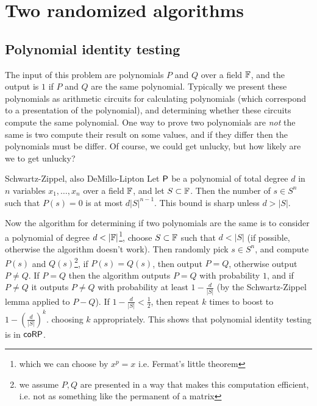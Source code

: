 \documentclass{article}
\begin{document}
\newlec 


\newlec 


\newlec 

\section{Two randomized algorithms}
\subsection{Polynomial identity testing}
The input of this problem are polynomials $P$ and $Q$ over a field $\mathbb{F}$, and the output is $1$ if $P$ and $Q$ are the same polynomial. Typically we present these polynomials as arithmetic circuits for calculating polynomials (which correspond to a presentation of the polynomial), and determining whether these circuits compute the same polynomial. \gap 
One way to prove two polynomials are \textit{not} the same is two compute their result on some values, and if they differ then the polynomials must be differ. Of course, we could get unlucky, but how likely are we to get unlucky?
\begin{fancylem}{Schwartz-Zippel, also DeMillo-Lipton}
    Let $\mathsf{P}$ be a polynomial of total degree $d$ in $n$ variables $x_{1}, \dots, x_{n}$ over a field $\mathbb{F}$, and let $S \subset \mathbb{F}$. Then the number of $s \in S^{n}$ such that $P(s)=0$ is at most $d|S|^{n-1}$. This bound is sharp unless $d > |S|$.
\end{fancylem}
\endproof 
Now the algorithm for determining if two polynomials are the same is to consider a polynomial of degree $d < |\mathbb{F}|$\footnote{which we can choose by $x^{p}=x$ i.e. Fermat's little theorem}, choose $S \subset \mathbb{F}$ such that $d< |S|$ (if possible, otherwise the algorithm doesn't work). \gap 
Then randomly pick $s \in S^{n}$, and compute $P(s)$ and $Q(s)$\footnote{we assume $P,Q$ are presented in a way that makes this computation efficient, i.e. not as something like the permanent of a matrix}, if $P(s)=Q(s)$, then output $P=Q$, otherwise output $P \neq Q$. If $P=Q$ then the algorithm outputs $P=Q$ with probability $1$, and if $P\neq Q$ it outputs $P \neq Q$ with probability at least $1-\frac{d}{|S|}$ (by the Schwartz-Zippel lemma applied to $P-Q$). \gap
If $1-\frac{d}{|S|}<\frac{1}{2}$, then repeat $k$ times to boost to $1-(\frac{d}{|S|})^{k}$. choosing $k$ appropriately. This shows that polynomial identity testing is in $\mathsf{coRP}$.
\end{document}
